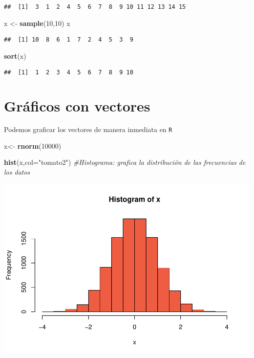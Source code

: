 \documentclass[
]{book}
\newenvironment{Shaded}{\begin{snugshade}}{\end{snugshade}}
\newcommand{\AttributeTok}[1]{\textcolor[rgb]{0.13,0.29,0.53}{#1}}
\newcommand{\CommentTok}[1]{\textcolor[rgb]{0.56,0.35,0.01}{\textit{#1}}}
\newcommand{\DecValTok}[1]{\textcolor[rgb]{0.00,0.00,0.81}{#1}}
\newcommand{\FunctionTok}[1]{\textcolor[rgb]{0.13,0.29,0.53}{\textbf{#1}}}
\newcommand{\NormalTok}[1]{#1}
\newcommand{\OtherTok}[1]{\textcolor[rgb]{0.56,0.35,0.01}{#1}}
\newcommand{\StringTok}[1]{\textcolor[rgb]{0.31,0.60,0.02}{#1}}
\begin{document}
\begin{verbatim}
##  [1]  3  1  2  4  5  6  7  8  9 10 11 12 13 14 15
\end{verbatim}

\begin{Shaded}
\begin{Highlighting}[]
\NormalTok{x }\OtherTok{\textless{}{-}} \FunctionTok{sample}\NormalTok{(}\DecValTok{10}\NormalTok{,}\DecValTok{10}\NormalTok{)}
\NormalTok{x}
\end{Highlighting}
\end{Shaded}

\begin{verbatim}
##  [1] 10  8  6  1  7  2  4  5  3  9
\end{verbatim}

\begin{Shaded}
\begin{Highlighting}[]
\FunctionTok{sort}\NormalTok{(x)}
\end{Highlighting}
\end{Shaded}

\begin{verbatim}
##  [1]  1  2  3  4  5  6  7  8  9 10
\end{verbatim}

\section{Gráficos con vectores}\label{gruxe1ficos-con-vectores}

Podemos graficar los vectores de manera inmediata en \texttt{R}

\begin{Shaded}
\begin{Highlighting}[]
\NormalTok{x}\OtherTok{\textless{}{-}} \FunctionTok{rnorm}\NormalTok{(}\DecValTok{10000}\NormalTok{)}

\FunctionTok{hist}\NormalTok{(x,}\AttributeTok{col=}\StringTok{"tomato2"}\NormalTok{) }\CommentTok{\#Histograma: grafica la distribución de las frecuencias de los datos }
\end{Highlighting}
\end{Shaded}

\includegraphics{bookdown-demo_files/figure-latex/unnamed-chunk-76-1.pdf}
\end{document}
